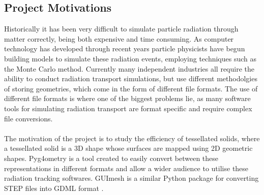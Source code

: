 \documentclass[12pt,a4paper]{article}
\begin{document}

\subsection{Project Motivations}
\label{motiv}
\noindent Historically it has been very difficult to simulate particle radiation through matter correctly, being both expensive and time consuming. As computer technology has developed through recent years particle physicists have begun building models to simulate these radiation events, employing techniques such as the Monte Carlo method. Currently many independent industries all require the ability to conduct radiation transport simulations, but use different methodolgies of storing geometries, which come in the form of different file formats. The use of different file formats is where one of the biggest problems lie, as many software tools for simulating radiation transport are format specific and require complex file conversions. 
\\\\
The motivation of the project is to study the efficiency of tessellated solids, where a tessellated solid is a 3D shape whose surfaces are mapped using 2D geometric shapes. Pyg4ometry is a tool created to easily convert between these representations in different formats and allow a wider audience to utilise these radiation tracking softwares. GUImesh is a similar Python package for converting STEP files into GDML format \cite{meh}.
\end{document}
